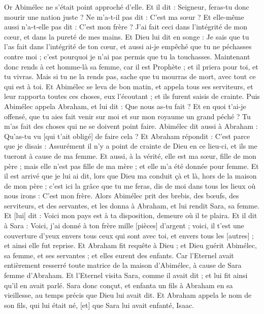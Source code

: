 \begin{multicols}{2}
Or Abimélec ne s'était point approché d'elle. Et il dit : Seigneur, feras-tu donc mourir une nation juste ?
Ne m'a-t-il pas dit : C'est ma sœur ? Et elle-même aussi n'a-t-elle pas dit : C'est mon frère ? J'ai fait ceci dans l'intégrité de mon cœur, et dans la pureté de mes mains.
Et Dieu lui dit en songe : Je sais que tu l'as fait dans l'intégrité de ton cœur, et aussi ai-je empêché que tu ne péchasses contre moi ; c'est pourquoi je n'ai pas permis que tu la touchasses.
Maintenant donc rends à cet homme-là sa femme, car il est Prophète ; et il priera pour toi, et tu vivras. Mais si tu ne la rends pas, sache que tu mourras de mort, avec tout ce qui est à toi.
Et Abimélec se leva de bon matin, et appela tous ses serviteurs, et leur rapporta toutes ces choses, eux l'écoutant ; et ils furent saisis de crainte.
Puis Abimélec appela Abraham, et lui dit : Que nous as-tu fait ? Et en quoi t'ai-je offensé, que tu aies fait venir sur moi et sur mon royaume un grand péché ? Tu m'as fait des choses qui ne se doivent point faire.
Abimélec dit aussi à Abraham : Qu'as-tu vu [qui t'ait obligé] de faire cela ?
Et Abraham répondit : C'est parce que je disais : Assurément il n'y a point de crainte de Dieu en ce lieu-ci, et ils me tueront à cause de ma femme.
Et aussi, à la vérité, elle est ma sœur, fille de mon père ; mais elle n'est pas fille de ma mère ; et elle m'a été donnée pour femme.
Et il est arrivé que je lui ai dit, lors que Dieu ma conduit çà et là, hors de la maison de mon père ; c'est ici la grâce que tu me feras, dis de moi dans tous les lieux où nous irons : C'est mon frère.
Alors Abimélec prit des brebis, des bœufs, des serviteurs, et des servantes, et les donna à Abraham, et lui rendit Sara, sa femme.
Et [lui] dit : Voici mon pays est à ta disposition, demeure où il te plaira.
Et il dit à Sara : Voici, j'ai donné à ton frère mille [pièces] d'argent ; voici, il t'est une couverture d'yeux envers tous ceux qui sont avec toi, et envers tous les [autres] ; et ainsi elle fut reprise.
Et Abraham fit requête à Dieu ; et Dieu guérit Abimélec, sa femme, et ses servantes ; et elles eurent des enfants.
Car l'Eternel avait entièrement resserré toute matrice de la maison d'Abimélec, à cause de Sara femme d'Abraham.
\VerseOne{}Et l'Eternel visita Sara, comme il avait dit ; et lui fit ainsi qu'il en avait parlé.
Sara donc conçut, et enfanta un fils à Abraham en sa vieillesse, au temps précis que Dieu lui avait dit.
Et Abraham appela le nom de son fils, qui lui était né, [et] que Sara lui avait enfanté, Isaac.

\end{multicols}
